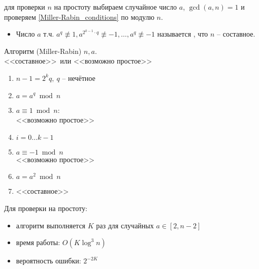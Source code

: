 \documentclass{beamer}
\begin{document}
\begin{frame}
     для проверки $n$ на простоту выбираем случайное число $a$, $\gcd(a,n)=1$ и проверяем \eqref{Miller-Rabin_conditions} по модулю $n$.
    
    \begin{itemize}
        \item Число $a$ т.ч. $a^q \not\equiv 1, a^{2^{k-1} \cdot q} \not\equiv -1, \ldots, a^{q} \not\equiv -1$ называется , что $n$ -- составное.
    \end{itemize}
\end{frame}

\begin{frame}{Алгоритм (Miller-Rabin)}
     $n, a$.\\
     <<составное>>~или <<возможно простое>>
    \begin{enumerate}
        \item $n-1 = 2^kq,\ q$ -- нечётное
        \item $a = a^q\bmod n$
        \item {} {$a \equiv 1\bmod n$}:\\
        \quad {} <<возможно простое>>
        \item {} {$i = 0 \ldots k-1$}
        \item \quad {} $a\equiv -1\bmod n$ \\
        \quad \quad {} <<возможно простое>>
        \item \quad $a = a^2\bmod n$
        \item {} <<составное>>
    \end{enumerate}
\end{frame}

\begin{frame}
    Для проверки на простоту:
    \begin{itemize}
        \item алгоритм выполняется $K$ раз для случайных $a \in [2, n-2]$
        \item время работы: $O(K \log^3{n})$
        \item вероятность ошибки: $2^{-2 K}$
    \end{itemize}
\end{frame}
\end{document}
